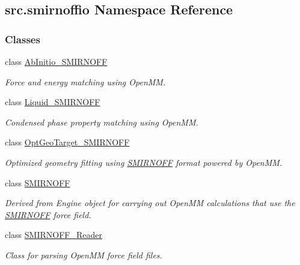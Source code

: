 \hypertarget{namespacesrc_1_1smirnoffio}{}\subsection{src.\+smirnoffio Namespace Reference}
\label{namespacesrc_1_1smirnoffio}
\subsubsection*{Classes}
\begin{DoxyCompactItemize}
\item 
class \hyperlink{classsrc_1_1smirnoffio_1_1AbInitio__SMIRNOFF}{Ab\+Initio\+\_\+\+S\+M\+I\+R\+N\+O\+FF}
\begin{DoxyCompactList}\small\item\em Force and energy matching using Open\+MM. \end{DoxyCompactList}\item 
class \hyperlink{classsrc_1_1smirnoffio_1_1Liquid__SMIRNOFF}{Liquid\+\_\+\+S\+M\+I\+R\+N\+O\+FF}
\begin{DoxyCompactList}\small\item\em Condensed phase property matching using Open\+MM. \end{DoxyCompactList}\item 
class \hyperlink{classsrc_1_1smirnoffio_1_1OptGeoTarget__SMIRNOFF}{Opt\+Geo\+Target\+\_\+\+S\+M\+I\+R\+N\+O\+FF}
\begin{DoxyCompactList}\small\item\em Optimized geometry fitting using \hyperlink{classsrc_1_1smirnoffio_1_1SMIRNOFF}{S\+M\+I\+R\+N\+O\+FF} format powered by Open\+MM. \end{DoxyCompactList}\item 
class \hyperlink{classsrc_1_1smirnoffio_1_1SMIRNOFF}{S\+M\+I\+R\+N\+O\+FF}
\begin{DoxyCompactList}\small\item\em Derived from Engine object for carrying out Open\+MM calculations that use the \hyperlink{classsrc_1_1smirnoffio_1_1SMIRNOFF}{S\+M\+I\+R\+N\+O\+FF} force field. \end{DoxyCompactList}\item 
class \hyperlink{classsrc_1_1smirnoffio_1_1SMIRNOFF__Reader}{S\+M\+I\+R\+N\+O\+F\+F\+\_\+\+Reader}
\begin{DoxyCompactList}\small\item\em Class for parsing Open\+MM force field files. \end{DoxyCompactList}\item 

\end{DoxyCompactItemize}
